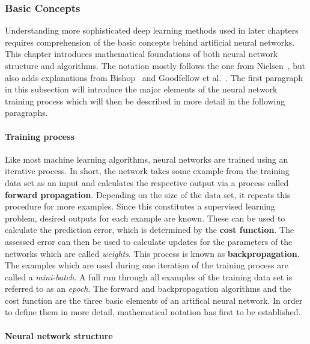 \subsubsection{Basic Concepts}
\label{sub:dl_concepts}

Understanding more sophisticated deep learning methods used in later
chapters requires comprehension of the basic concepts behind artificial
neural networks.
This chapter introduces mathematical foundations of both neural network
structure and algorithms.
The notation mostly follows the one from Nielsen~\cite{Nielsen2015}, but also
adds explanations from Bishop~\cite{Bishop2006} and Goodfellow et al.~\cite{Goodfellow2016}.
The first paragraph in this subsection will introduce the major elements
of the neural network training process which will then be described in more
detail in the following paragraphs.

\paragraph{Training process}

Like most machine learning algorithms, neural networks are trained using an iterative process.
In short, the network takes some example from the training data set as an input 
and calculates the respective output via a process called 
\textbf{forward propagation}.
Depending on the size of the data set, it repeats this procedure for more 
examples.
Since this constitutes a supervised learning problem, desired outputs for
each example are known.
These can be used to calculate the prediction error, which is determined by the
\textbf{cost function}.
The assessed error can then be used to calculate updates for the parameters of
the networks which are called \textit{weights}.
This process is known as \textbf{backpropagation}.
The examples which are used during one iteration of the training process are
called a \textit{mini-batch}.
A full run through all examples of the training data set is referred to as an
\textit{epoch}.
The forward and backpropagation algorithms and the cost function are the three
basic elements of an artifical neural network. 
In order to define them in more detail, mathematical notation has first to be
established.

\paragraph{Neural network structure}

